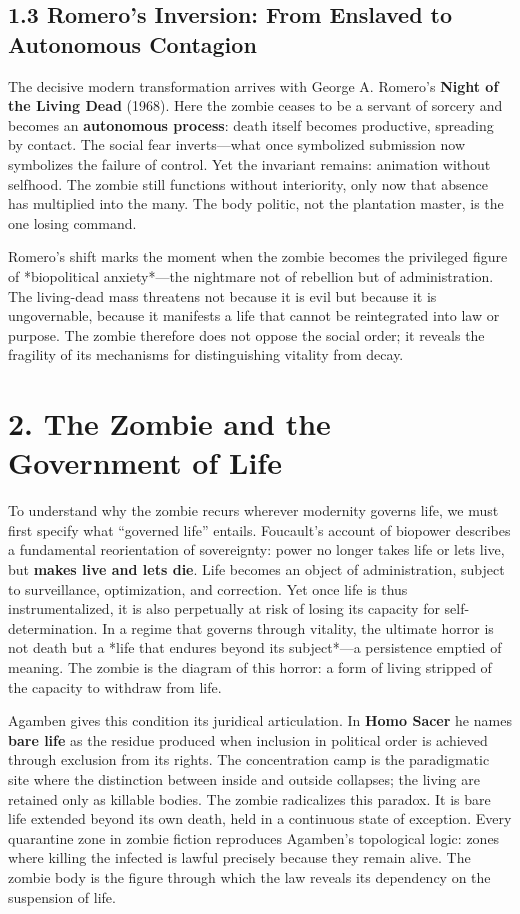 \documentclass[11pt]{article}
\begin{document}
\subsection*{1.3 Romero’s Inversion: From Enslaved to Autonomous Contagion}
\label{sec:org13ddbcc}

The decisive modern transformation arrives with George A. Romero’s \textbf{Night of the Living Dead} (1968). Here the zombie ceases to be a servant of sorcery and becomes an \textbf{autonomous process}: death itself becomes productive, spreading by contact. The social fear inverts—what once symbolized submission now symbolizes the failure of control. Yet the invariant remains: animation without selfhood. The zombie still functions without interiority, only now that absence has multiplied into the many. The body politic, not the plantation master, is the one losing command.

Romero’s shift marks the moment when the zombie becomes the privileged figure of *biopolitical anxiety*—the nightmare not of rebellion but of administration. The living-dead mass threatens not because it is evil but because it is ungovernable, because it manifests a life that cannot be reintegrated into law or purpose. The zombie therefore does not oppose the social order; it reveals the fragility of its mechanisms for distinguishing vitality from decay.
\section*{2. The Zombie and the Government of Life}
\label{sec:org42b524d}

To understand why the zombie recurs wherever modernity governs life, we must first specify what “governed life” entails. Foucault’s account of biopower describes a fundamental reorientation of sovereignty: power no longer takes life or lets live, but \textbf{makes live and lets die}. Life becomes an object of administration, subject to surveillance, optimization, and correction. Yet once life is thus instrumentalized, it is also perpetually at risk of losing its capacity for self-determination. In a regime that governs through vitality, the ultimate horror is not death but a *life that endures beyond its subject*—a persistence emptied of meaning. The zombie is the diagram of this horror: a form of living stripped of the capacity to withdraw from life.

Agamben gives this condition its juridical articulation. In \textbf{Homo Sacer} he names \textbf{bare life} as the residue produced when inclusion in political order is achieved through exclusion from its rights. The concentration camp is the paradigmatic site where the distinction between inside and outside collapses; the living are retained only as killable bodies. The zombie radicalizes this paradox. It is bare life extended beyond its own death, held in a continuous state of exception. Every quarantine zone in zombie fiction reproduces Agamben’s topological logic: zones where killing the infected is lawful precisely because they remain alive. The zombie body is the figure through which the law reveals its dependency on the suspension of life.
\end{document}
